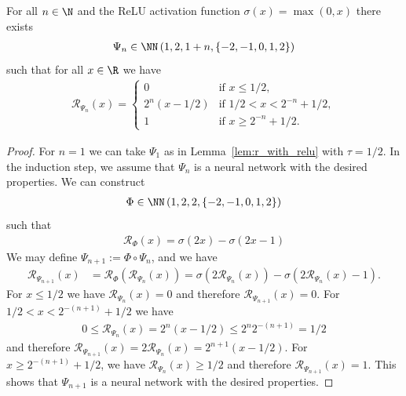 \documentclass{amsart}[11pt]
\numberwithin{equation}{section}
\newcommand{\realization}{\mathcal{R}}
\numberwithin{theorem}{section}
\begin{document}
\begin{lemma}\label{lem:bounded_weights}
    For all $n \in \N$ and the ReLU activation function $\sigma(x) = \max(0, x)$ there exists 
    \begin{align*}
        \Psi_n \in \NN\left(1, 2, 1 + n, \left\{-2, -1, 0, 1, 2 \right\}\right)
    \end{align*}
    such that for all $x \in \R$ we have
    \begin{align*}
        \realization_{\Psi_n}(x) = \begin{cases}
            0 & \text{if } x \leq 1/2,\\
            2^n(x - 1/2) & \text{if } 1/2 < x < 2^{-n} + 1/2,\\
            1 & \text{if } x \geq 2^{-n} + 1/2.
        \end{cases}
    \end{align*}
\end{lemma}
\begin{proof}
    For $n = 1$ we can take $\Psi_1$ as in Lemma~\ref{lem:r_with_relu} with $\tau = 1/2$. In the induction step, we assume that $\Psi_n$ is a neural network with the desired properties. We can construct 
    \begin{align*}
        \Phi \in \NN\left(1, 2, 2, \left\{-2, -1, 0, 1, 2 \right\}\right)
    \end{align*}
    such that 
    \begin{align*}
        \realization_\Phi(x) = \sigma(2x) - \sigma(2x - 1)
    \end{align*}
    We may define $\Psi_{n + 1} := \Phi \circ \Psi_n$, and we have
    \begin{align*}
        \realization_{\Psi_{n + 1}}(x) &= \realization_\Phi(\realization_{\Psi_n}(x)) = \sigma(2\realization_{\Psi_n}(x)) - \sigma(2\realization_{\Psi_n}(x) - 1).
    \end{align*}
    For $x \leq 1/2$ we have $\realization_{\Psi_n}(x) = 0$ and therefore $\realization_{\Psi_{n + 1}}(x) = 0$. For $1/2 < x < 2^{-(n + 1)} + 1/2$ we have 
    \begin{align*}
        0 \leq \realization_{\Psi_n}(x) = 2^n(x - 1/2) \leq 2^n 2^{-(n + 1)} = 1/2
    \end{align*}
    and therefore $\realization_{\Psi_{n + 1}}(x) = 2\realization_{\Psi_n}(x) = 2^{n + 1}(x - 1/2)$. For $x \geq 2^{-(n + 1)} + 1/2$, we have $\realization_{\Psi_n}(x) \geq 1/2$ and therefore $\realization_{\Psi_{n + 1}}(x) = 1$. This shows that $\Psi_{n + 1}$ is a neural network with the desired properties.
\end{proof}
\end{document}
